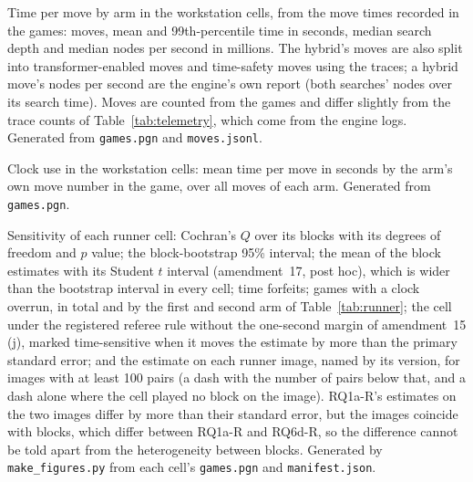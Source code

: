 \documentclass{article}
\newif\iffinal
\newif\ifresults
\newcommand{\pending}[1]{\iffinal\PackageError{paper}{Pending content: #1}{Fill it from the artifact before the final build.}\else\textcolor{red}{[PENDING: #1]}\fi}
\begin{document}
\begin{table}[ht]
\centering
\caption{Time per move by arm in the workstation cells, from the move times recorded in the games: moves, mean and 99th-percentile time in seconds, median search depth and median nodes per second in millions. The hybrid's moves are also split into transformer-enabled moves and time-safety moves using the traces; a hybrid move's nodes per second are the engine's own report (both searches' nodes over its search time). Moves are counted from the games and differ slightly from the trace counts of Table~\ref{tab:telemetry}, which come from the engine logs. Generated from \texttt{games.pgn} and \texttt{moves.jsonl}.}
\label{tab:timing}
\footnotesize
\ifresults\else{}\fi
\end{table}
\begin{table}[ht]
\centering
\caption{Clock use in the workstation cells: mean time per move in seconds by the arm's own move number in the game, over all moves of each arm. Generated from \texttt{games.pgn}.}
\label{tab:timeprofile}
\footnotesize
\ifresults\else{}\fi
\end{table}
\begin{table}[ht]
\centering
\caption{Sensitivity of each runner cell: Cochran's $Q$ over its blocks with its degrees of freedom and $p$ value; the block-bootstrap 95\% interval; the mean of the block estimates with its Student $t$ interval (amendment~17, post hoc), which is wider than the bootstrap interval in every cell; time forfeits; games with a clock overrun, in total and by the first and second arm of Table~\ref{tab:runner}; the cell under the registered referee rule without the one-second margin of amendment~15 (j), marked time-sensitive when it moves the estimate by more than the primary standard error; and the estimate on each runner image, named by its version, for images with at least 100 pairs (a dash with the number of pairs below that, and a dash alone where the cell played no block on the image). RQ1a-R's estimates on the two images differ by more than their standard error, but the images coincide with blocks, which differ between RQ1a-R and RQ6d-R, so the difference cannot be told apart from the heterogeneity between blocks. Generated by \texttt{make\_figures.py} from each cell's \texttt{games.pgn} and \texttt{manifest.json}.}
\label{tab:runner-sens}
\footnotesize
\ifresults\resizebox{\linewidth}{!}{}\else{}\fi
\end{table}
\end{document}
